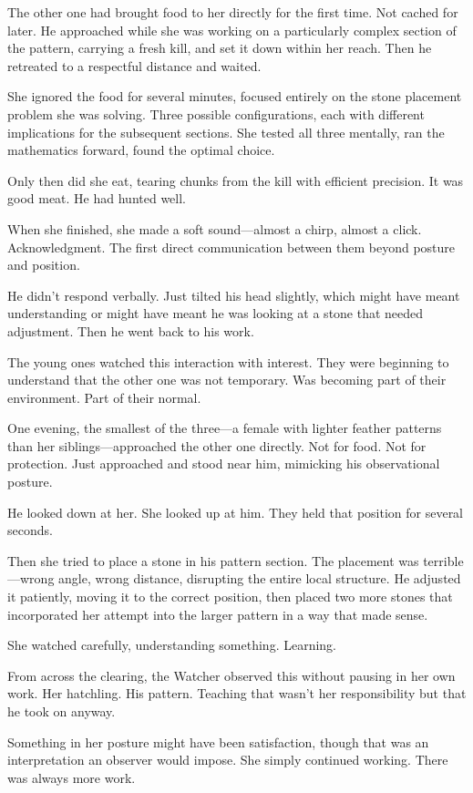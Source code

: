 The other one had brought food to her directly for the first time. Not cached for later. He approached while she was working on a particularly complex section of the pattern, carrying a fresh kill, and set it down within her reach. Then he retreated to a respectful distance and waited.

She ignored the food for several minutes, focused entirely on the stone placement problem she was solving. Three possible configurations, each with different implications for the subsequent sections. She tested all three mentally, ran the mathematics forward, found the optimal choice.

Only then did she eat, tearing chunks from the kill with efficient precision. It was good meat. He had hunted well.

When she finished, she made a soft sound—almost a chirp, almost a click. Acknowledgment. The first direct communication between them beyond posture and position.

He didn't respond verbally. Just tilted his head slightly, which might have meant understanding or might have meant he was looking at a stone that needed adjustment. Then he went back to his work.

The young ones watched this interaction with interest. They were beginning to understand that the other one was not temporary. Was becoming part of their environment. Part of their normal.

One evening, the smallest of the three—a female with lighter feather patterns than her siblings—approached the other one directly. Not for food. Not for protection. Just approached and stood near him, mimicking his observational posture.

He looked down at her. She looked up at him. They held that position for several seconds.

Then she tried to place a stone in his pattern section. The placement was terrible—wrong angle, wrong distance, disrupting the entire local structure. He adjusted it patiently, moving it to the correct position, then placed two more stones that incorporated her attempt into the larger pattern in a way that made sense.

She watched carefully, understanding something. Learning.

From across the clearing, the Watcher observed this without pausing in her own work. Her hatchling. His pattern. Teaching that wasn't her responsibility but that he took on anyway.

Something in her posture might have been satisfaction, though that was an interpretation an observer would impose. She simply continued working. There was always more work.

